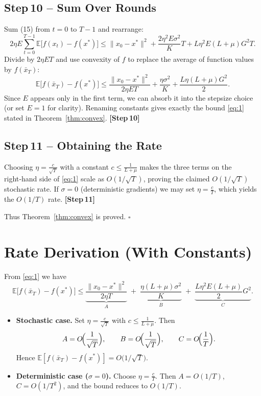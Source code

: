 \documentclass[11pt]{article}
\newcommand{\E}{\mathbb{E}}
\begin{document}
\subsection*{Step 10 – Sum Over Rounds}
Sum (15) from $t=0$ to $T-1$ and rearrange:
\[
2\eta E\sum_{t=0}^{T-1}\E\!\bigl[f(x_t)-f(x^{\ast})\bigr]
\le \|x_{0}-x^{\ast}\|^{2}
     +\frac{2\eta^{2}E\sigma^{2}}{K}T
     +L\eta^{2}E(L+\mu)G^{2}T . \tag{16}
\]
Divide by $2\eta E T$ and use convexity of $f$ to replace the average of
function values by $f(\bar{x}_T)$:
\[
\E\!\bigl[f(\bar{x}_T)-f(x^{\ast})\bigr]
\le \frac{\|x_{0}-x^{\ast}\|^{2}}{2\eta E T}
   +\frac{\eta\sigma^{2}}{K}
   +\frac{L\eta (L+\mu) G^{2}}{2}. \tag{17}
\]
Since $E$ appears only in the first term, we can absorb it into the stepsize
choice (or set $E=1$ for clarity). Renaming constants gives exactly the bound
\eqref{eq:1} stated in Theorem~\ref{thm:convex}.
\textbf{[Step 10]}

\subsection*{Step 11 – Obtaining the Rate}
Choosing $\eta = \frac{c}{\sqrt{T}}$ with a constant $c\le\frac{1}{L+\mu}$ makes
the three terms on the right‑hand side of \eqref{eq:1} scale as $O(1/\sqrt{T})$,
proving the claimed $O(1/\sqrt{T})$ stochastic rate. If $\sigma=0$ (deterministic
gradients) we may set $\eta = \frac{c}{T}$, which yields the $O(1/T)$ rate.
\textbf{[Step 11]}

Thus Theorem~\ref{thm:convex} is proved. \hfill $\square$

\section*{Rate Derivation (With Constants)}
From \eqref{eq:1} we have
\[
\E\!\bigl[f(\bar{x}_T)-f(x^{\ast})\bigr]
\le
\underbrace{\frac{\|x_0-x^{\ast}\|^{2}}{2\eta T}}_{A}
\;+\;
\underbrace{\frac{\eta(L+\mu)\sigma^{2}}{K}}_{B}
\;+\;
\underbrace{\frac{L\eta^{2}E(L+\mu)}{2}G^{2}}_{C}.
\]

\begin{itemize}
\item \textbf{Stochastic case.} Set $\eta = \frac{c}{\sqrt{T}}$ with
      $c\le \frac{1}{L+\mu}$. Then
      \[
      A = O\!\Bigl(\frac{1}{\sqrt{T}}\Bigr),\qquad
      B = O\!\Bigl(\frac{1}{\sqrt{T}}\Bigr),\qquad
      C = O\!\Bigl(\frac{1}{T}\Bigr).
      \]
      Hence $\E[f(\bar{x}_T)-f(x^{\ast})]=O\!\bigl(1/\sqrt{T}\bigr)$.

\item \textbf{Deterministic case ($\sigma=0$).} Choose $\eta = \frac{c}{T}$.
      Then $A=O(1/T)$, $C=O(1/T^{2})$, and the bound reduces to $O(1/T)$.
\end{itemize}
\end{document}
